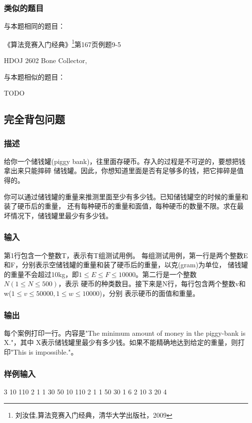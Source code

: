 \subsubsection{类似的题目}
与本题相同的题目：
\begindot
\item 《算法竞赛入门经典》\footnote{刘汝佳,算法竞赛入门经典，清华大学出版社，2009}第167页例题9-5
\item  HDOJ 2602 Bone Collector, 
\myenddot

与本题相似的题目：
\begindot
\item  TODO
\myenddot

\subsection{完全背包问题}
\label{sec:ukp}

\subsubsection{描述}
给你一个储钱罐(piggy bank)，往里面存硬币。存入的过程是不可逆的，要想把钱拿出来只能摔碎
储钱罐。因此，你想知道里面是否有足够多的钱，把它摔碎是值得的。

你可以通过储钱罐的重量来推测里面至少有多少钱。已知储钱罐空的时候的重量和装了硬币后的重量，
还有每种硬币的重量和面值，每种硬币的数量不限。求在最坏情况下，储钱罐里最少有多少钱。

\subsubsection{输入}
第1行包含一个整数T，表示有T组测试用例。
每组测试用例，第一行是两个整数E和F，分别表示空储钱罐的重量和装了硬币后的重量，以克(gram)为单位，
储钱罐的重量不会超过10kg，即$1 \leq E \leq F \leq 10000$。第二行是一个整数$N(1 \leq N \leq 500)$，表示
硬币的种类数目。接下来是N行，每行包含两个整数v和w($1 \leq v \leq 50000, 1 \leq w \leq 10000$)，分别
表示硬币的面值和重量。

\subsubsection{输出}
每个案例打印一行。内容是"The minimum amount of money in the piggy-bank is X."，其中
X表示储钱罐里最少有多少钱。如果不能精确地达到给定的重量，则打印"This is impossible."。

\subsubsection{样例输入}
\begin{Code}
3
10 110
2
1 1
30 50
10 110
2
1 1
50 30
1 6
2
10 3
20 4
\end{Code}

